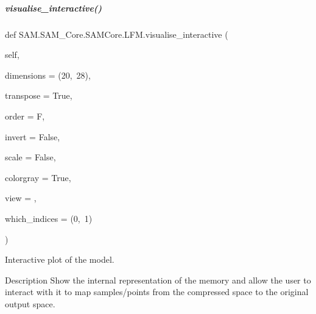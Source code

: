 \mbox{\label{group__icubclient__SAM__Core_adf56eff4d79e3253dd095bcad6ddcf14}} 
\subparagraph{\texorpdfstring{visualise\+\_\+interactive()}{visualise\_interactive()}}
{\footnotesize\ttfamily def S\+A\+M.\+S\+A\+M\+\_\+\+Core.\+S\+A\+M\+Core.\+L\+F\+M.\+visualise\+\_\+interactive (\begin{DoxyParamCaption}\item[{}]{self,  }\item[{}]{dimensions = {\ttfamily (20,~28)},  }\item[{}]{transpose = {\ttfamily True},  }\item[{}]{order = {\ttfamily \textquotesingle{}F\textquotesingle{}},  }\item[{}]{invert = {\ttfamily False},  }\item[{}]{scale = {\ttfamily False},  }\item[{}]{colorgray = {\ttfamily True},  }\item[{}]{view = {},  }\item[{}]{which\+\_\+indices = {\ttfamily (0,~1)} }\end{DoxyParamCaption})}



Interactive plot of the model. 

\begin{DoxyParagraph}{Description}
Show the internal representation of the memory and allow the user to interact with it to map samples/points from the compressed space to the original output space.
\end{DoxyParagraph}

